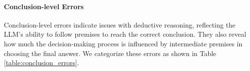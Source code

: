 


\paragraph{Conclusion-level Errors} 
Conclusion-level errors indicate issues with deductive reasoning, reflecting the LLM's ability to follow premises to reach the correct conclusion. They also reveal how much the decision-making process is influenced by intermediate premises in choosing the final answer. We categorize these errors as shown in Table \ref{table:conclusion_errors}.  



